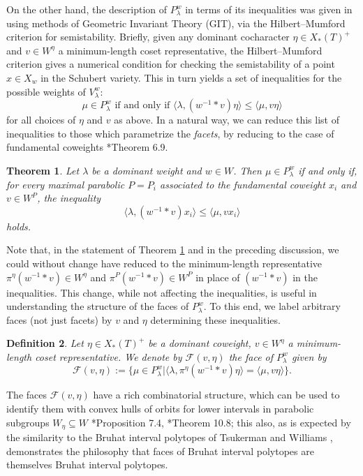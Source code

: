 \documentclass[12pt,reqno]{amsart}
\newtheorem{theorem}{Theorem}[section]
\newtheorem{definition}[theorem]{Definition}
\theoremstyle{definition}
\begin{document}
On the other hand, the description of $P^w_\lambda$ in terms of its inequalities was given in \cite{BJK2} using methods of Geometric Invariant Theory (GIT), via the Hilbert--Mumford criterion for semistability. Briefly, given any dominant cocharacter $\eta \in X_\ast(T)^+$ and $v \in W^\eta$ a minimum-length coset representative, the Hilbert--Mumford criterion gives a numerical condition for checking the semistability of a point $x \in X_w$ in the Schubert variety. This in turn yields a set of inequalities for the possible weights of $V^w_\lambda$:
$$
\mu \in P^w_\lambda \text{ if and only if }
\langle \lambda, (w^{-1} \ast v) \eta \rangle \leq \langle \mu, v \eta \rangle
$$
for all choices of $\eta$ and $v$ as above. In a natural way, we can reduce this list of inequalities to those which parametrize the \textit{facets}, by reducing to the case of fundamental coweights \cite{BJK2}*{Theorem 6.9}.

\begin{theorem} \label{FacetInequalities}
Let $\lambda$ be a dominant weight and $w \in W$. Then $\mu \in P^w_\lambda$ if and only if, for every maximal parabolic $P=P_i$ associated to the fundamental coweight $x_i$ and $v \in W^P$, the inequality 
$$
\langle \lambda, (w^{-1} \ast v)x_i \rangle \leq \langle \mu, vx_i \rangle
$$
holds. 
\end{theorem}

Note that, in the statement of Theorem \ref{FacetInequalities} and in the preceding discussion, we could without change have reduced to the minimum-length representative $\pi^\eta(w^{-1} \ast v) \in W^\eta$ and $\pi^P(w^{-1} \ast v) \in W^P$ in place of $(w^{-1} \ast v)$ in the inequalities. This change, while not affecting the inequalities, is useful in understanding the structure of the faces of $P^w_\lambda$. To this end, we label arbitrary faces (not just facets) by $v$ and $\eta$ determining these inequalities.

\begin{definition} \label{FaceDef}
Let $\eta \in X_\ast(T)^+$ be a dominant coweight, $v \in W^\eta$ a minimum-length coset representative. We denote by $\mathcal{F}(v,\eta)$ the face of $P^w_\lambda$ given by 
$$
\mathcal{F}(v,\eta):=\{\mu \in P^w_\lambda | \langle \lambda, \pi^\eta(w^{-1} \ast v) \eta \rangle = \langle \mu, v \eta \rangle \}.
$$
\end{definition}

The faces $\mathcal{F}(v,\eta)$ have a rich combinatorial structure, which can be used to identify them with convex hulls of orbits for lower intervals in parabolic subgroups $W_\eta \subseteq W$ \cite{BJK2}*{Proposition 7.4}, \cite{BJK3}*{Theorem 10.8}; this also, as is expected by the similarity to the Bruhat interval polytopes of Tsukerman and Williams \cite{TW}, demonstrates the philosophy that faces of Bruhat interval polytopes are themselves Bruhat interval polytopes. 
\end{document}
